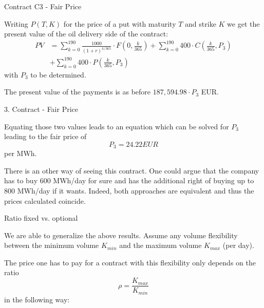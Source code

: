 {Contract C3 - Fair Price}






	Writing $P(T,K)$ for the price of a put with maturity $T$ and strike $K$ we get the present value of the oil delivery side of the contract:
\begin{align*}
	PV &= \sum_{k=0}^{190} \frac{1000}{(1+r)^{k/365}} \cdot F(0,\frac k {365}) + \sum_{k=0}^{190} 400 \cdot C(\frac k {365},P_3)\\
	 &+ \sum_{k=0}^{190} 400 \cdot P(\frac k {365},P_3)
\end{align*}
with $P_3$ to be determined.

	The present value of the payments is as before $187,594.98 \cdot P_3$ EUR.






{3. Contract - Fair Price}






	Equating those two values leads to an equation which can be solved for $P_3$ leading to the fair price of
$$
	P_3 = 24.22 EUR
$$
per MWh.

There is an other way of seeing this contract. One could argue that the company has to buy 600 MWh/day for sure and has the additional right of buying up to 800 MWh/day if it wants. Indeed, both approaches are equivalent and thus the prices calculated coincide.







{Ratio fixed vs. optional}






	We are able to generalize the above results. Assume any volume flexibility between the minimum volume $K_{min}$ and the maximum volume $K_{max}$ (per day).

	The price one has to pay for a contract with this flexibility only depends on the ratio
$$
	\rho = \frac{K_{max}}{K_{min}}
$$
in the following way:



